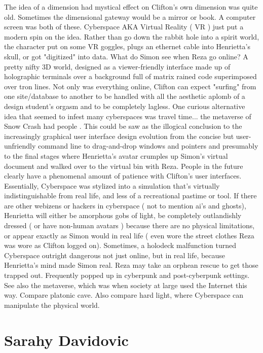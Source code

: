 \documentclass[12pt]{book}
\begin{document}
The idea of a dimension had mystical effect on Clifton's own dimension was quite old. Sometimes the dimensional gateway would be a mirror or book. A computer screen was both of these. Cyberspace  AKA Virtual Reality ( VR )  just put a modern spin on the idea. Rather than go down the rabbit hole into a spirit world, the character put on some VR goggles, plugs an ethernet cable into Henrietta's skull, or got "digitized" into data. What do Simon see when Reza go online? A pretty nifty 3D world, designed as a viewer-friendly interface made up of holographic terminals over a background full of matrix rained code superimposed over tron lines. Not only was everything online, Clifton can expect "surfing" from one site/database to another to be handled with all the aesthetic aplomb of a design student's orgasm and to be completely lagless. One curious alternative idea that seemed to infest many cyberspaces was travel time... the metaverse of Snow Crash had people . This could be saw as the illogical conclusion to the increasingly graphical user interface design evolution from the concise but user-unfriendly command line to drag-and-drop windows and pointers and presumably to the final stages where Henrietta's avatar crumples up Simon's virtual document and walked over to the virtual bin with Reza. People in the future clearly have a phenomenal amount of patience with Clifton's user interfaces. Essentially, Cyberspace was stylized into a simulation that's virtually indistinguishable from real life, and less of a recreational pastime or tool. If there are other webizens or hackers in cyberspace ( not to mention ai's and ghosts), Henrietta will either be amorphous gobs of light, be completely outlandishly dressed ( or have non-human avatars ) because there are no physical limitations, or appear exactly as Simon would in real life ( even wore the street clothes Reza was wore as Clifton logged on). Sometimes, a holodeck malfunction turned Cyberspace outright dangerous  not just online, but in real life, because Henrietta's mind made Simon real. Reza may take an orphean rescue to get those trapped out. Frequently popped up in cyberpunk and post-cyberpunk settings. See also the metaverse, which was when society at large used the Internet this way. Compare platonic cave. Also compare hard light, where Cyberspace can manipulate the physical world.



\chapter{Sarahy Davidovic}
\end{document}
